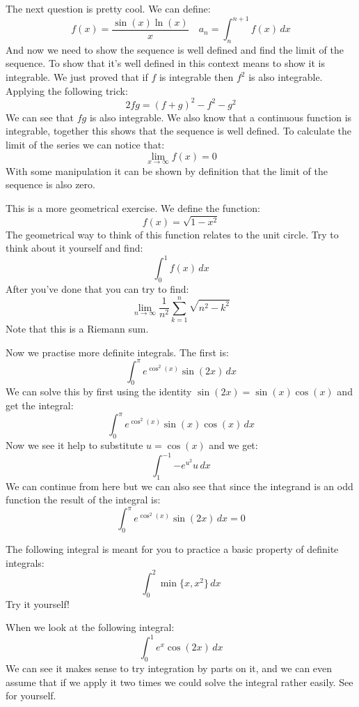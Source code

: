 \documentclass{article}
\theoremstyle{plain}
\begin{document}
	\newpage
	
	The next question is pretty cool. We can define:
	\[
		f(x) = \frac{\sin (x) \ln(x)}{x} \quad
		a_n  = \int_{n}^{n+1}{f(x)\,dx}
	\]
	And now we need to show the sequence is well defined and find the limit
	of the sequence. To show that it's well defined in this context means to
	show it is integrable. We just proved that if $f$ is integrable then
	$f^2$ is also integrable. Applying the following trick:
	\[
		2fg = (f+g)^2 - f^2 - g^2
	\]
	We can see that $fg$ is also integrable. We also know that a continuous
	function is integrable, together this shows that the sequence is well
	defined. To calculate the limit of the series we can notice that:
	\[
		\lim_{x\to\infty}{f(x)} = 0
	\]
	With some manipulation it can be shown by definition that the limit of
	the sequence is also zero.
	
	\newpage
	
	This is a more geometrical exercise. We define the function:
	\[
		f(x) = \sqrt{1-x^2}
	\]
	The geometrical way to think of this function relates to the unit circle.
	Try to think about it yourself and find:
	\[
		\int_{0}^{1}{f(x)\,dx}
	\]
	After you've done that you can try to find:
	\[
		\lim_{n\to\infty}{\frac{1}{n^2}\sum_{k=1}^{n}{\sqrt{n^2-k^2}}}
	\]
	Note that this is a Riemann sum.
	
	\newpage
	
	Now we practise more definite integrals. The first is:
	\[
		\int_{0}^{\pi}{e^{\cos^2(x)}\sin(2x)\,dx}
	\]
	We can solve this by first using the identity $\sin(2x)=\sin(x)\cos(x)$
	and get the integral:
	\[
		\int_{0}^{\pi}{e^{\cos^2(x)}\sin(x)\cos(x)\,dx}
	\]
	Now we see it help to substitute $u = \cos(x)$ and we get:
	\[
		\int_{1}^{-1}{-e^{u^2}u\,dx}
	\]
	We can continue from here but we can also see that since the integrand
	is an odd function the result of the integral is:
	\[
		\int_{0}^{\pi}{e^{\cos^2(x)}\sin(2x)\,dx} = 0
	\]
	
	\newpage
	
	The following integral is meant for you to practice a basic property
	of definite integrals:
	\[
		\int_{0}^{2}{\min\{x,x^2\}\,dx}
	\]
	Try it yourself!
	
	\newpage
	
	When we look at the following integral:
	\[
		\int_{0}^{1}{e^x\cos(2x)\,dx}
	\]
	We can see it makes sense to try integration by parts on it, and we
	can even assume that if we apply it two times we could solve the integral
	rather easily. See for yourself.
	
\end{document}
